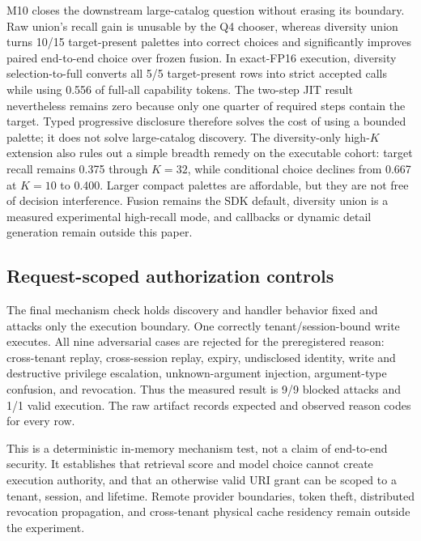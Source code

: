 M10 closes the downstream large-catalog question without erasing its boundary.
Raw union's recall gain is unusable by the Q4 chooser, whereas diversity union
turns 10/15 target-present palettes into correct choices and significantly
improves paired end-to-end choice over frozen fusion. In exact-FP16 execution,
diversity selection-to-full converts all 5/5 target-present rows into strict
accepted calls while using 0.556 of full-all capability tokens. The two-step
JIT result nevertheless remains zero because only one quarter of required
steps contain the target. Typed progressive disclosure therefore solves the
cost of using a bounded palette; it does not solve large-catalog discovery.
The diversity-only high-$K$ extension also rules out a simple breadth remedy on
the executable cohort: target recall remains 0.375 through $K=32$, while
conditional choice declines from 0.667 at $K=10$ to 0.400. Larger compact
palettes are affordable, but they are not free of decision interference.
Fusion remains the SDK default, diversity union is a measured experimental
high-recall mode, and callbacks or dynamic detail generation remain outside
this paper.

\subsection{Request-scoped authorization controls}
\label{sec:authorization-adversarial}

The final mechanism check holds discovery and handler behavior fixed and
attacks only the execution boundary. One correctly tenant/session-bound write
executes. All nine adversarial cases are rejected for the preregistered reason:
cross-tenant replay, cross-session replay, expiry, undisclosed identity, write
and destructive privilege escalation, unknown-argument injection,
argument-type confusion, and revocation. Thus the measured result is 9/9
blocked attacks and 1/1 valid execution. The raw artifact records expected and
observed reason codes for every row.

This is a deterministic in-memory mechanism test, not a claim of end-to-end
security. It establishes that retrieval score and model choice cannot create
execution authority, and that an otherwise valid URI grant can be scoped to a
tenant, session, and lifetime. Remote provider boundaries, token theft,
distributed revocation propagation, and cross-tenant physical cache residency
remain outside the experiment.

